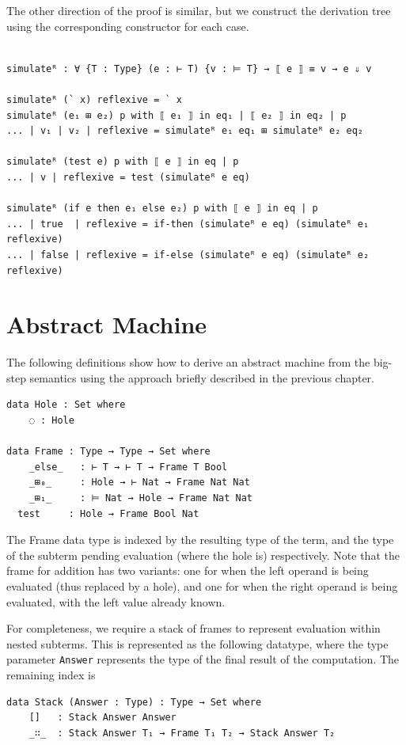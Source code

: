 The other direction of the proof is similar, but we construct the derivation tree using the corresponding constructor for each case.
\begin{verbatim}

simulateᴿ : ∀ {T : Type} (e : ⊢ T) {v : ⊨ T} → ⟦ e ⟧ ≡ v → e ⇓ v

simulateᴿ (` x) reflexive = ` x
simulateᴿ (e₁ ⊞ e₂) p with ⟦ e₁ ⟧ in eq₁ | ⟦ e₂ ⟧ in eq₂ | p
... | v₁ | v₂ | reflexive = simulateᴿ e₁ eq₁ ⊞ simulateᴿ e₂ eq₂

simulateᴿ (test e) p with ⟦ e ⟧ in eq | p
... | v | reflexive = test (simulateᴿ e eq)

simulateᴿ (if e then e₁ else e₂) p with ⟦ e ⟧ in eq | p
... | true  | reflexive = if-then (simulateᴿ e eq) (simulateᴿ e₁ reflexive)
... | false | reflexive = if-else (simulateᴿ e eq) (simulateᴿ e₂ reflexive)
\end{verbatim}

\section{Abstract Machine}

The following definitions show how to derive an abstract machine from the big-step semantics using the approach briefly described in the previous chapter.

\begin{verbatim}
data Hole : Set where
    ◌ : Hole

data Frame : Type → Type → Set where
    _𝚎𝚕𝚜𝚎_   : ⊢ T → ⊢ T → Frame T Bool
    _⊞₀_     : Hole → ⊢ Nat → Frame Nat Nat
    _⊞₁_     : ⊨ Nat → Hole → Frame Nat Nat
  test     : Hole → Frame Bool Nat
\end{verbatim}

The Frame data type is indexed by the resulting type of the term, and the type of the subterm pending evaluation (where the hole is) respectively.
Note that the frame for addition has two variants: one for when the left operand is being evaluated (thus replaced by a hole), and one for when the right operand is being evaluated, with the left value already known.

For completeness, we require a stack of frames to represent evaluation within nested subterms. 
This is represented as the following datatype, where the type parameter \texttt{Answer} represents the type of the final result of the computation. The remaining index is 

\begin{verbatim}
data Stack (Answer : Type) : Type → Set where
    []   : Stack Answer Answer
    _∷_  : Stack Answer T₁ → Frame T₁ T₂ → Stack Answer T₂
\end{verbatim}

